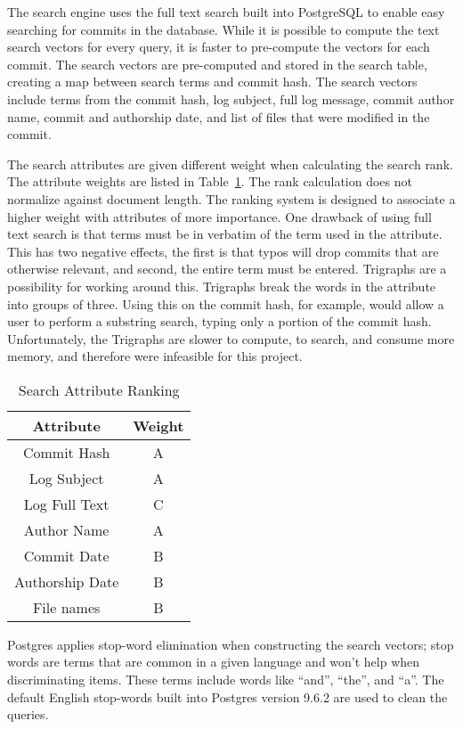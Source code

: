 The search engine uses the full text search built into PostgreSQL to
enable easy searching for commits in the database. While it is possible
to compute the text search vectors for every query, it is faster to
pre-compute the vectors for each commit. The search vectors are
pre-computed and stored in the search table, creating a map between
search terms and commit hash. The search vectors include terms from the
commit hash, log subject, full log message, commit author name, commit
and authorship date, and list of files that were modified in the commit.

The search attributes are given different weight when calculating the
search rank. The attribute weights are listed in
Table~\ref{tab:search_attribute_rank}. The rank calculation does not
normalize against document length. The ranking system is designed to
associate a higher weight with attributes of more importance. One
drawback of using full text search is that terms must be in verbatim of
the term used in the attribute. This has two negative effects, the first
is that typos will drop commits that are otherwise relevant, and second,
the entire term must be entered. Trigraphs are a possibility for working
around this. Trigraphs break the words in the attribute into groups of
three. Using this on the commit hash, for example, would allow a user to
perform a substring search, typing only a portion of the commit hash.
Unfortunately, the Trigraphs are slower to compute, to search, and
consume more memory, and therefore were infeasible for this project.

\begin{table}[htpb]
  \centering
  \caption{Search Attribute Ranking}
  \label{tab:search_attribute_rank}
  \begin{tabular}{cc}
    \toprule
    Attribute       & Weight\\
    \midrule
    Commit Hash     & A \\
    Log Subject     & A \\
    Log Full Text   & C \\
    Author Name     & A \\
    Commit Date     & B \\
    Authorship Date & B \\
    File names      & B \\
    \bottomrule
  \end{tabular}
\end{table}

Postgres applies stop-word elimination when constructing the search
vectors; stop words are terms that are common in a given language and
won't help when discriminating items. These terms include words like
``and'', ``the'', and ``a''. The default English stop-words built into
Postgres version 9.6.2 are used to clean the queries.

